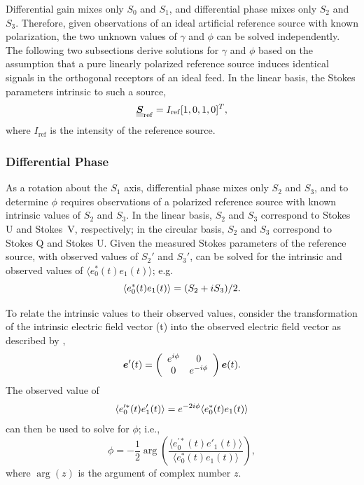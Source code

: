 Differential gain mixes only $S_0$ and $S_1$, and differential phase mixes only $S_2$ and $S_3$.
Therefore, given observations of an ideal artificial reference source with known polarization, 
the two unknown values of $\gamma$ and $\phi$ can be solved independently. 
%
The following two subsections derive solutions for 
$\gamma$ and $\phi$ based on the assumption that
a pure linearly polarized reference source
induces identical signals in the orthogonal receptors
of an ideal feed.
%
In the linear basis, the Stokes parameters intrinsic to such a source,
\begin{equation}
    \label{eqn:ideal_noise_diode}
    \underline{\underline{\mbox{\boldmath $S$}}}_\mathrm{ref} = I_\mathrm{ref} [1, 0, 1, 0]^T,
\end{equation}
%
where $I_\mathrm{ref}$ is the intensity of the reference source.

\subsubsection{ Differential Phase }
\label{sec:ideal_differential_phase}

As a rotation about the $S_1$ axis, differential phase mixes only $S_2$
and $S_3$, and to determine $\phi$ requires observations of a polarized reference source with known intrinsic values of
$S_2$ and $S_3$.  In the linear basis, $S_2$ and $S_3$ correspond to Stokes U and Stokes~V,
respectively; in the circular basis, $S_2$ and $S_3$ correspond to Stokes Q and Stokes U.
%
Given the measured Stokes parameters of the reference source, with observed values of $S_2'$ and $S_3'$,  can be solved for the intrinsic and observed values of $\langle e_0^*(t)e_1(t)\rangle$; e.g.
%
\begin{equation}
\langle e_0^*(t)e_1(t)\rangle = (S_2 + i S_3) / 2.
\end{equation}

To relate the intrinsic values to their observed values, 
consider the transformation of the intrinsic electric field vector (t)
into the observed electric field vector as described by ,
%
\begin{equation}
\mbox{\boldmath $e$}'(t) =
	\left( \begin{array}{cc}
		e^{i \phi} & 0 \\
		0   & e^{-i \phi}
	\end{array} \right) \mbox{\boldmath $e$}(t).
\end{equation}
%
The observed value of 
\begin{equation}
\langle e_0^{\prime*}(t)e'_1(t) \rangle = e^{-2i\phi} \langle e_0^*(t)e_1(t)\rangle
\end{equation}
can then be used to solve for $\phi$; i.e.,
\begin{equation}
\phi = -\frac{1}{2} \arg\left(
\frac{\langle e_0^{\prime*}(t)e'_1(t) \rangle}{\langle e_0^*(t)e_1(t)\rangle}\right),
\end{equation}
where $\arg(z)$ is the argument of complex number $z$.

